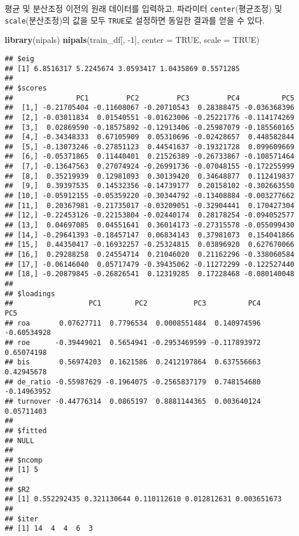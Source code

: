 \documentclass[]{book}
\newenvironment{Shaded}{\begin{snugshade}}{\end{snugshade}}
\newcommand{\DataTypeTok}[1]{\textcolor[rgb]{0.13,0.29,0.53}{#1}}
\newcommand{\DecValTok}[1]{\textcolor[rgb]{0.00,0.00,0.81}{#1}}
\newcommand{\KeywordTok}[1]{\textcolor[rgb]{0.13,0.29,0.53}{\textbf{#1}}}
\newcommand{\NormalTok}[1]{#1}
\newcommand{\OtherTok}[1]{\textcolor[rgb]{0.56,0.35,0.01}{#1}}
\begin{document}
평균 및 분산조정 이전의 원래 데이터를 입력하고, 파라미터 \texttt{center}(평균조정) 및 \texttt{scale}(분산조정)의 값을 모두 \texttt{TRUE}로 설정하면 동일한 결과를 얻을 수 있다.

\begin{Shaded}
\begin{Highlighting}[]
\KeywordTok{library}\NormalTok{(nipals)}
\KeywordTok{nipals}\NormalTok{(train_df[, }\DecValTok{-1}\NormalTok{], }\DataTypeTok{center =} \OtherTok{TRUE}\NormalTok{, }\DataTypeTok{scale =} \OtherTok{TRUE}\NormalTok{)}
\end{Highlighting}
\end{Shaded}

\begin{verbatim}
## $eig
## [1] 6.8516317 5.2245674 3.0593417 1.0435869 0.5571285
## 
## $scores
##               PC1         PC2         PC3         PC4          PC5
##  [1,] -0.21705404 -0.11608067 -0.20710543  0.28388475 -0.036368396
##  [2,] -0.03011834  0.01540551 -0.01623006 -0.25221776 -0.114174269
##  [3,]  0.02869590 -0.18575892 -0.12913406 -0.25987079 -0.185560165
##  [4,] -0.34348333  0.67105909  0.05310696 -0.02428657  0.448582844
##  [5,] -0.13073246 -0.27851123  0.44541637 -0.19321728  0.099609669
##  [6,] -0.05371865  0.11440401  0.21526389 -0.26733867 -0.108571464
##  [7,] -0.13647563  0.27074924 -0.26991736 -0.07048155 -0.172255999
##  [8,]  0.35219939  0.12981093  0.30139420  0.34648877  0.112419837
##  [9,]  0.39397535  0.14532356 -0.14739177  0.20158102 -0.302663550
## [10,] -0.05912155 -0.05359220 -0.30344792 -0.13408884 -0.003277662
## [11,]  0.20367981 -0.21735017 -0.03209051 -0.32904441  0.170427304
## [12,] -0.22453126 -0.22153804 -0.02440174  0.28178254 -0.094052577
## [13,]  0.04697085  0.04551641  0.36014173 -0.27315578 -0.055099430
## [14,] -0.29641393 -0.18457147  0.06834143  0.37981073  0.154041866
## [15,]  0.44350417 -0.16932257 -0.25324815  0.03896920  0.627670066
## [16,]  0.29288258  0.24554714  0.21046020  0.21162296 -0.338060584
## [17,] -0.06146040  0.05717479 -0.39435062 -0.11272299 -0.122527440
## [18,] -0.20879845 -0.26826541  0.12319285  0.17228468 -0.080140048
## 
## $loadings
##                  PC1        PC2           PC3          PC4         PC5
## roa       0.07627711  0.7796534  0.0008551484  0.140974596 -0.60534928
## roe      -0.39449021  0.5654941 -0.2953469599 -0.117893972  0.65074198
## bis       0.56974203  0.1621586  0.2412197864  0.637556663  0.42945678
## de_ratio -0.55987629 -0.1964075 -0.2565837179  0.748154680 -0.14963952
## turnover -0.44776314  0.0865197  0.8881144365  0.003640124  0.05711403
## 
## $fitted
## NULL
## 
## $ncomp
## [1] 5
## 
## $R2
## [1] 0.552292435 0.321130644 0.110112610 0.012812631 0.003651673
## 
## $iter
## [1] 14  4  4  6  3
\end{verbatim}
\end{document}

